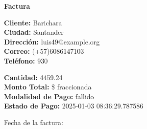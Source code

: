 \documentclass{article}
\begin{document}
\begin{center}
    {\LARGE \textbf{Factura}}\\[1cm]
\end{center}

\textbf{Cliente:} Barichara \\
\textbf{Ciudad:} Santander \\
\textbf{Dirección:} luis49@example.org \\
\textbf{Correo:} (+57)6086147103 \\
\textbf{Teléfono:} 930 \\

\vspace{0.5cm}

\textbf{Cantidad:} 4459.24 \\
\textbf{Monto Total:} \$ fraccionada \\
\textbf{Modalidad de Pago:} fallido \\
\textbf{Estado de Pago:} 2025-01-03 08:36:29.787586 \\

\vspace{1cm}

Fecha de la factura: 
\end{document}
